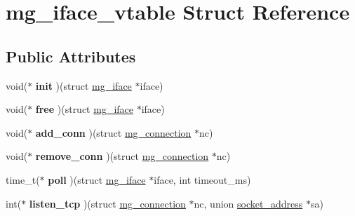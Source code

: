 \hypertarget{structmg__iface__vtable}{}\section{mg\+\_\+iface\+\_\+vtable Struct Reference}
\label{structmg__iface__vtable}
\subsection*{Public Attributes}
\begin{DoxyCompactItemize}
\item 
\mbox{\label{structmg__iface__vtable_a66915ed7fbcef057c33bb6dfa3d8a8ee}} 
void($\ast$ {\bfseries init} )(struct \hyperlink{structmg__iface}{mg\+\_\+iface} $\ast$iface)
\item 
\mbox{\label{structmg__iface__vtable_a267ee7de0f5c3f0eedee5ee5d093a810}} 
void($\ast$ {\bfseries free} )(struct \hyperlink{structmg__iface}{mg\+\_\+iface} $\ast$iface)
\item 
\mbox{\label{structmg__iface__vtable_a1b09df656c627c217c4f8efebef85a1e}} 
void($\ast$ {\bfseries add\+\_\+conn} )(struct \hyperlink{structmg__connection}{mg\+\_\+connection} $\ast$nc)
\item 
\mbox{\label{structmg__iface__vtable_a3b76727f620579f2e5b2b18c346e71b4}} 
void($\ast$ {\bfseries remove\+\_\+conn} )(struct \hyperlink{structmg__connection}{mg\+\_\+connection} $\ast$nc)
\item 
\mbox{\label{structmg__iface__vtable_a11baf939815da0f0fc71f27692f907a5}} 
time\+\_\+t($\ast$ {\bfseries poll} )(struct \hyperlink{structmg__iface}{mg\+\_\+iface} $\ast$iface, int timeout\+\_\+ms)
\item 
\mbox{\label{structmg__iface__vtable_a8b75b7e0f1ebd12f00580756ffdbda28}} 
int($\ast$ {\bfseries listen\+\_\+tcp} )(struct \hyperlink{structmg__connection}{mg\+\_\+connection} $\ast$nc, union \hyperlink{unionsocket__address}{socket\+\_\+address} $\ast$sa)
\item 
\mbox{\label{structmg__iface__vtable_a940fbc2eecb7353136647724d6f4cb39}} 

\end{DoxyCompactItemize}
